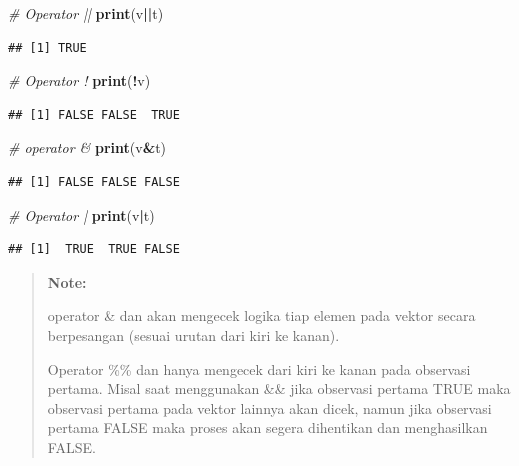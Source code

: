 \documentclass[]{book}
\newenvironment{Shaded}{\begin{snugshade}}{\end{snugshade}}
\newcommand{\KeywordTok}[1]{\textcolor[rgb]{0.13,0.29,0.53}{\textbf{#1}}}
\newcommand{\CommentTok}[1]{\textcolor[rgb]{0.56,0.35,0.01}{\textit{#1}}}
\newcommand{\OperatorTok}[1]{\textcolor[rgb]{0.81,0.36,0.00}{\textbf{#1}}}
\newcommand{\NormalTok}[1]{#1}
\begin{document}
\begin{Shaded}
\begin{Highlighting}[]
\CommentTok{# Operator ||}
\KeywordTok{print}\NormalTok{(v}\OperatorTok{||}\NormalTok{t)}
\end{Highlighting}
\end{Shaded}

\begin{verbatim}
## [1] TRUE
\end{verbatim}

\begin{Shaded}
\begin{Highlighting}[]
\CommentTok{# Operator !}
\KeywordTok{print}\NormalTok{(}\OperatorTok{!}\NormalTok{v)}
\end{Highlighting}
\end{Shaded}

\begin{verbatim}
## [1] FALSE FALSE  TRUE
\end{verbatim}

\begin{Shaded}
\begin{Highlighting}[]
\CommentTok{# operator &}
\KeywordTok{print}\NormalTok{(v}\OperatorTok{&}\NormalTok{t)}
\end{Highlighting}
\end{Shaded}

\begin{verbatim}
## [1] FALSE FALSE FALSE
\end{verbatim}

\begin{Shaded}
\begin{Highlighting}[]
\CommentTok{# Operator |}
\KeywordTok{print}\NormalTok{(v}\OperatorTok{|}\NormalTok{t)}
\end{Highlighting}
\end{Shaded}

\begin{verbatim}
## [1]  TRUE  TRUE FALSE
\end{verbatim}

\begin{quote}
\textbf{Note: }

operator \& dan \textbar{} akan mengecek logika tiap elemen pada vektor
secara berpesangan (sesuai urutan dari kiri ke kanan).

Operator \%\% dan \textbar{}\textbar{} hanya mengecek dari kiri ke kanan
pada observasi pertama. Misal saat menggunakan \&\& jika observasi
pertama TRUE maka observasi pertama pada vektor lainnya akan dicek,
namun jika observasi pertama FALSE maka proses akan segera dihentikan
dan menghasilkan FALSE.
\end{quote}
\end{document}
